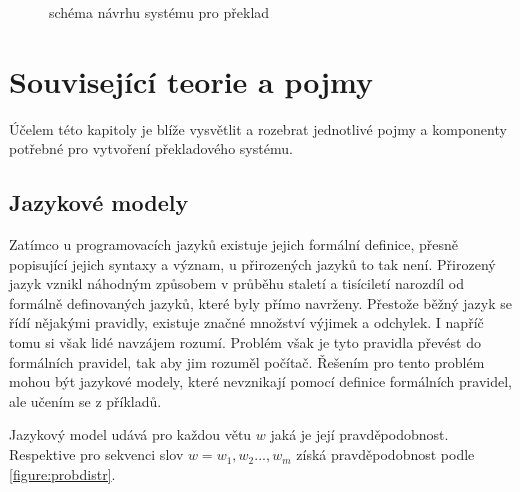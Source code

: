 \begin{figure}[h]
    \begin{center}
    \end{center}
	\caption{schéma návrhu systému pro překlad}
	\label{img:draft}
\end{figure}


\chapter{Související teorie a pojmy}
Účelem této kapitoly je blíže vysvětlit a rozebrat jednotlivé pojmy a komponenty potřebné pro vytvoření překladového systému. 



\section{Jazykové modely}\label{section:langmodel}
Zatímco u programovacích jazyků existuje jejich formální definice, přesně popisující jejich syntaxy a význam, u přirozených jazyků to tak není. Přirozený jazyk vznikl náhodným způsobem v průběhu staletí a tisíciletí narozdíl od formálně definovaných jazyků, které byly přímo navrženy. Přestože běžný jazyk se řídí nějakými pravidly, existuje značné množství výjimek a odchylek. I napříč tomu si však lidé navzájem rozumí. Problém však je tyto pravidla převést do formálních pravidel, tak aby jim rozuměl počítač. Řešením pro tento problém mohou být jazykové modely, které nevznikají pomocí definice formálních pravidel, ale učením se z příkladů.

Jazykový model udává pro každou větu $w$ jaká je její pravděpodobnost. Respektive pro sekvenci slov $w = w_1, w_2..., w_m$ získá pravděpodobnost podle \ref{figure:probdistr}.


